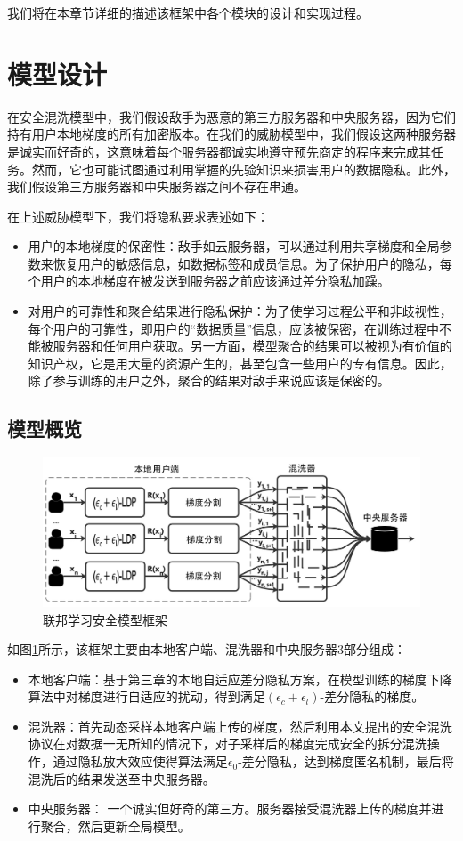 我们将在本章节详细的描述该框架中各个模块的设计和实现过程。

\section{模型设计}
在安全混洗模型中，我们假设敌手为恶意的第三方服务器和中央服务器，因为它们持有用户本地梯度的所有加密版本。在我们的威胁模型中，我们假设这两种服务器是诚实而好奇的，这意味着每个服务器都诚实地遵守预先商定的程序来完成其任务。然而，它也可能试图通过利用掌握的先验知识来损害用户的数据隐私。此外，我们假设第三方服务器和中央服务器之间不存在串通。

在上述威胁模型下，我们将隐私要求表述如下：
\begin{itemize}
  \item 用户的本地梯度的保密性：敌手如云服务器，可以通过利用共享梯度和全局参数来恢复用户的敏感信息，如数据标签和成员信息。为了保护用户的隐私，每个用户的本地梯度在被发送到服务器之前应该通过差分隐私加躁。
  \item 对用户的可靠性和聚合结果进行隐私保护：为了使学习过程公平和非歧视性，每个用户的可靠性，即用户的“数据质量”信息，应该被保密，在训练过程中不能被服务器和任何用户获取。另一方面，模型聚合的结果可以被视为有价值的知识产权，它是用大量的资源产生的，甚至包含一些用户的专有信息。因此，除了参与训练的用户之外，聚合的结果对敌手来说应该是保密的。
\end{itemize}

\subsection{模型概览}
\begin{figure}[!hbt]
\centering
	\includegraphics[scale=0.5]{fig2/C4/shuffle1}%
	\caption{联邦学习安全模型框架}
	\label{fig:联邦学习安全模型框架}	
\end{figure}

如图\ref{fig:联邦学习安全模型框架}所示，该框架主要由本地客户端、混洗器和中央服务器3部分组成：
\begin{itemize}
  \item 本地客户端：基于第三章的本地自适应差分隐私方案，在模型训练的梯度下降算法中对梯度进行自适应的扰动，得到满足$\left(\epsilon_{c}+\epsilon_{l}\right)$-差分隐私的梯度。
  \item 混洗器：首先动态采样本地客户端上传的梯度，然后利用本文提出的安全混洗协议在对数据一无所知的情况下，对子采样后的梯度完成安全的拆分混洗操作，通过隐私放大效应使得算法满足$\epsilon_{0}$-差分隐私，达到梯度匿名机制，最后将混洗后的结果发送至中央服务器。
  \item 中央服务器： 一个诚实但好奇的第三方。服务器接受混洗器上传的梯度并进行聚合，然后更新全局模型。
\end{itemize}


